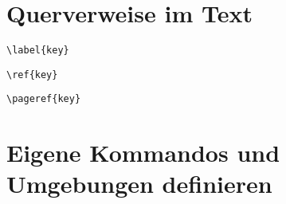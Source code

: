 



\section{Querverweise im Text}


\lstinline/\label{key}/

\lstinline/\ref{key}/

\lstinline/\pageref{key}/


\section{Eigene Kommandos und Umgebungen definieren}
\label{makros}


